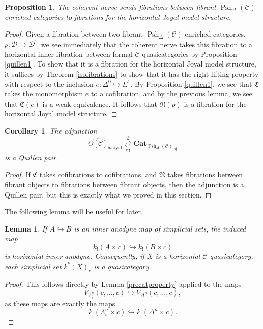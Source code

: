 \documentclass[leqno]{article}
\numberwithin{equation}{subsection}
\theoremstyle{plain}   %
\newtheorem{prop}[equation]{Proposition}
\newtheorem{cor}[equation]{Corollary}
\newtheorem{lemma}[equation]{Lemma}
\theoremstyle{remark}
\theoremstyle{plain}
\newcommand{\Cat}{\ensuremath{\mathbf{Cat}}}
\newcommand{\C}{\ensuremath{\mathcal{C}}}
\newcommand{\cellset}{\ensuremath{\widehat{\Theta[\mathcal{C}]}}}
\newcommand{\spsh}{\ensuremath{\operatorname{Psh}_\Delta(\mathcal{C})}}
\begin{document}
\begin{prop}
	The coherent nerve sends fibrations between fibrant \(\spsh\)-enriched categories to fibrations for the horizontal Joyal model structure.
\end{prop}
\begin{proof}
	Given a fibration between two fibrant \(\spsh\)-enriched categories, \(p:\mathcal{D}\to \mathcal{D}^\prime\), we see immediately that the coherent nerve takes this fibration to a horizontal inner fibration between formal \(\C\)-quasicategories by Proposition \ref{quillen1}.  To show that it is a fibration for the horizontal Joyal model structure, it suffices by Theorem \ref{isofibrations} to show that it has the right lifting property with respect to the inclusion \(e:\Delta^0 \hookrightarrow E^1\). By Proposition \ref{quillen1}, we see that \(\mathfrak{C}\) takes the monomorphism \(e\) to a cofibration, and by the previous lemma, we see that \(\mathfrak{C}(e)\) is a weak equivalence.  It follows that \(\mathfrak{N}(p)\) is a fibration for the horizontal Joyal model structure.
\end{proof}

\begin{cor}\label{horizquillen}
	The adjunction 
	\[\cellset_{\mathrm{hJoyal}} \underset{\mathfrak{N}}{\overset{\mathfrak{C}}{\rightleftarrows}} \Cat_{\spsh_{\mathrm{inj}}}\]
	is a Quillen pair.
\end{cor}
\begin{proof}
	If \(\mathfrak{C}\) takes cofibrations to cofibrations, and \(\mathfrak{N}\) takes fibrations between fibrant objects to fibrations between fibrant objects, then the adjunction is a Quillen pair, but this is exactly what we proved in this section.
\end{proof}

The following lemma will be useful for later.
\begin{lemma}\label{precatanodyne}
	If \(A\hookrightarrow B\) is an inner anodyne map of simplicial sets, the induced map
	\[k_!(A\times c) \hookrightarrow k_!(B\times c)\] is horizontal inner anodyne. Consequently, if \(X\) is a horizontal \(\C\)-quasicategory, each simplicial set \(k^\ast(X)_c\) is a quasicategory. 
\end{lemma}
\begin{proof}
	This follows directly by Lemma \ref{precatproperty} applied to the maps
	\[V_{\Lambda^n_i}(c,\dots,c) \hookrightarrow V_{\Delta^n}(c,\dots,c),\] as these maps are exactly the maps
	\[k_!(\Lambda^n_i\times c) \hookrightarrow k_!(\Delta^n \times c).\]
\end{proof}
\end{document}
